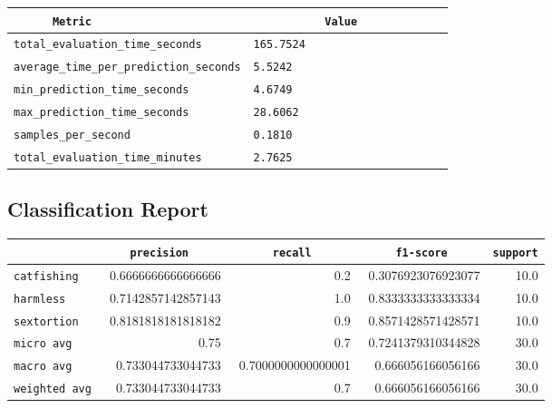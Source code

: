 \documentclass{article}
\begin{document}
\begin{center}
\begin{tabular}{l | l} \hline
    \verb|      Metric     | & \verb|           Value           | \\ \hline
    \hline
    \verb|total_evaluation_time_seconds| & \verb|165.7524                     | \\ \hline
    \verb|average_time_per_prediction_seconds| & \verb|5.5242                       | \\ \hline
    \verb|min_prediction_time_seconds| & \verb|4.6749                       | \\ \hline
    \verb|max_prediction_time_seconds| & \verb|28.6062                      | \\ \hline
    \verb|samples_per_second| & \verb|0.1810                       | \\ \hline
    \verb|total_evaluation_time_minutes| & \verb|2.7625                       | \\ \hline
\end{tabular}
\end{center}

\subsection{Classification Report}

\begin{center}
\begin{tabular}{l | r | r | r | r} \hline
    \verb|            | & \verb|    precision     | & \verb|      recall      | & \verb|     f1-score     | & \verb|support| \\ \hline
    \hline
    \verb|catfishing | & 0.6666666666666666 & 0.2 & 0.3076923076923077 &    10.0 \\ \hline
    \verb|harmless   | & 0.7142857142857143 & 1.0 & 0.8333333333333334 &    10.0 \\ \hline
    \verb|sextortion | & 0.8181818181818182 & 0.9 & 0.8571428571428571 &    10.0 \\ \hline
    \verb|micro avg  | & 0.75 & 0.7 & 0.7241379310344828 &    30.0 \\ \hline
    \verb|macro avg  | & 0.733044733044733 & 0.7000000000000001 & 0.666056166056166 &    30.0 \\ \hline
    \verb|weighted avg| & 0.733044733044733 & 0.7 & 0.666056166056166 &    30.0 \\ \hline
\end{tabular}
\end{center}
\end{document}
